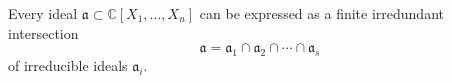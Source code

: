 Every ideal $\mathfrak{a} \subset \mathbb{C}[X_1, \ldots, X_n]$ can be expressed as a finite irredundant intersection
$$\mathfrak{a} = \mathfrak{a}_1 \cap \mathfrak{a}_2 \cap \cdots \cap \mathfrak{a}_s$$
of irreducible ideals $\mathfrak{a}_i$.
